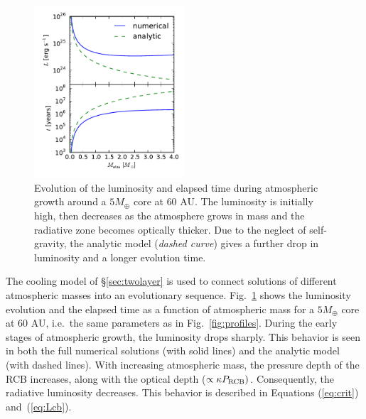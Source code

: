 \documentclass[apj, numberedappendix]{emulateapj}
\newcommand{\Eqs}[2]{Equations (\ref{#1}) and~(\ref{#2})}
\newcommand{\Fig}[1]{Fig.~\ref{#1}}
\newcommand{\cb}{_{\rm RCB}}
\begin{document}
\begin{figure}[tb]
\centering
\includegraphics[width=0.5\textwidth]{../../figs/ModelAtmospheres/RadSelfGravPoly/PaperFigs/Lt_profiles_v2.pdf}
\caption{Evolution of the luminosity and elapsed time during atmospheric growth around a $5 M_{\oplus}$ core at $60$ AU.  The luminosity is initially high, then decreases as the atmosphere grows in mass and the radiative zone becomes optically thicker.  Due to the neglect of self-gravity, the analytic model (\emph{dashed curve}) gives a further drop in luminosity and a longer evolution time.}
\label{fig:Ltplot}
\end{figure}

The cooling model of \S\ref{sec:twolayer} is used to connect solutions of different atmospheric masses into an evolutionary sequence.  \Fig{fig:Ltplot} shows the luminosity evolution and the elapsed time as a function of atmospheric mass for a $5 M_{\oplus}$ core at $60$ AU, i.e.\ the same parameters as in \Fig{fig:profiles}.  During the early stages of atmospheric growth, the luminosity drops sharply.  This behavior is seen in both the full numerical solutions (with solid lines) and the analytic model (with dashed lines).  With increasing atmospheric mass, the pressure depth of the RCB increases, along with the optical depth ($\propto \kappa P\cb)$.  Consequently, the radiative luminosity decreases.  This behavior is described in \Eqs{eq:crit}{eq:Lcb}.
\end{document}
